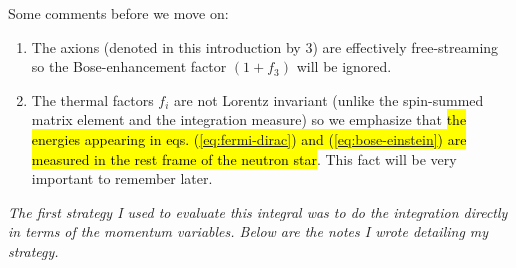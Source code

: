 Some comments before we move on:
\begin{enumerate}
    \item The axions (denoted in this introduction by $3$) are effectively free-streaming so the Bose-enhancement factor $(1 + f_3)$ will be ignored.
    \item The thermal factors $f_i$ are not Lorentz invariant (unlike the spin-summed matrix element and the integration measure) so we emphasize that \hl{the energies appearing in eqs. {(\ref{eq:fermi-dirac})} and  {(\ref{eq:bose-einstein})} are measured in the rest frame of the neutron star}. This fact will be very important to remember later.
\end{enumerate}

\label{subsec:direct-momentum-integration}
\emph{The first strategy I used to evaluate this integral was to do the integration directly in terms of the momentum variables. Below are the notes I wrote detailing my strategy.}

